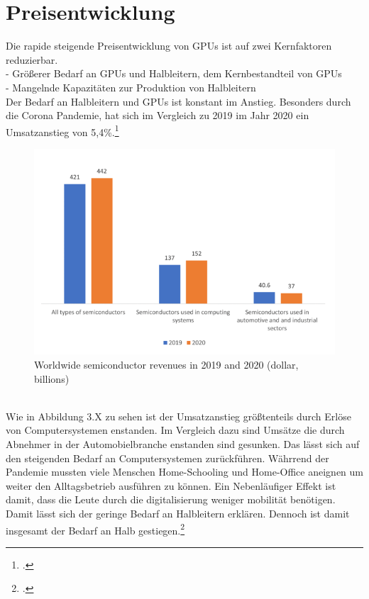 \documentclass[12pt,toc=bib,toc=listof]{scrreprt}
\begin{document}
\section{Preisentwicklung}
\label{sec:Preisentwicklung}

Die rapide steigende Preisentwicklung von GPUs ist auf zwei Kernfaktoren reduzierbar.\\
- Größerer Bedarf an GPUs und Halbleitern, dem Kernbestandteil von GPUs\\
- Mangelnde Kapazitäten zur Produktion von Halbleitern\\
Der Bedarf an Halbleitern und GPUs ist konstant im Anstieg. Besonders durch die Corona Pandemie,
hat sich im Vergleich zu 2019 im Jahr 2020 ein Umsatzanstieg von 5,4\%.\footcite [Vgl.] []{Voas.2021}
\begin{figure}[h]
  \centering
  \includegraphics[scale=0.5]{Abbildungen/voas1.png} %
  \caption[]{Worldwide semiconductor revenues in 2019 and 2020 (dollar, billions)}
\end{figure}
\\Wie in Abbildung 3.X zu sehen ist der Umsatzanstieg größtenteils durch Erlöse von Computersystemen enstanden.
Im Vergleich dazu sind Umsätze die durch Abnehmer in der Automobielbranche enstanden sind gesunken.
Das lässt sich auf den steigenden Bedarf an Computersystemen zurückführen. Währrend der Pandemie mussten
viele Menschen Home-Schooling und Home-Office aneignen um weiter den Alltagsbetrieb ausführen zu können.
Ein Nebenläufiger Effekt ist damit, dass die Leute durch die digitalisierung weniger mobilität benötigen.
Damit lässt sich der geringe Bedarf an Halbleitern erklären. Dennoch ist damit insgesamt der Bedarf an 
Halb gestiegen.\footcite [Vgl.] []{Voas.2021}
\end{document}
